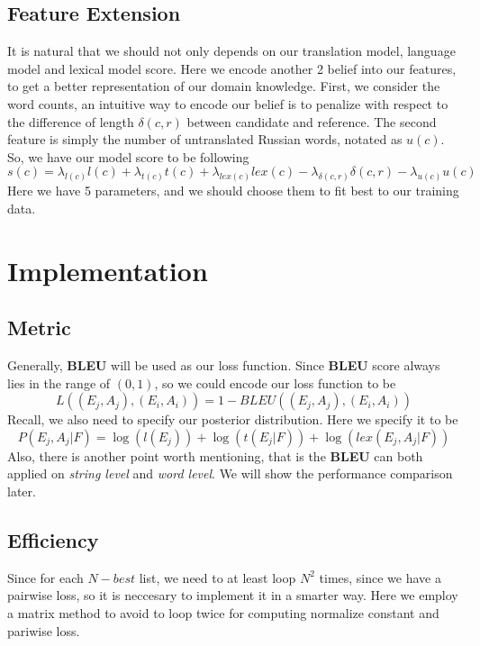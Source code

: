 \documentclass[11pt]{article}
\begin{document}
\subsection{Feature Extension} %
\label{sub:feature_extension}
It is natural that we should not only depends on our translation model, language model and lexical model score. Here we encode another 2 belief into our features, to get a better representation of our domain knowledge. First, we consider the word counts, an intuitive way to encode our belief is to penalize with respect to the difference of length $\delta(c, r)$ between candidate and reference. The second feature is simply the number of untranslated Russian words, notated as $u(c)$. So, we have our model score to be following
$$ s(c) = \lambda_{l(c)}l(c) + \lambda_{t(c)}t(c) + \lambda_{lex(c)}lex(c) - \lambda_{\delta(c, r)}\delta(c, r) - \lambda_{u(c)}u(c)$$
Here we have 5 parameters, and we should choose them to fit best to our training data.

\section{Implementation} %
\label{sec:implementation}
\subsection{Metric} %
\label{sub:metric}
Generally, \textbf{BLEU} will be used as our loss function. Since \textbf{BLEU} score always lies in the range of $(0,1)$, so we could encode our loss function to be
$$ L((E_j,A_j), (E_i,A_i)) = 1 - BLEU((E_j,A_j), (E_i,A_i))$$
Recall, we also need to specify our posterior distribution. Here we specify it to be
$$ P(E_j,A_j|F) = \log(l(E_j)) +  \log(t(E_j|F)) + \log(lex(E_j,A_j|F))$$
Also, there is another point worth mentioning, that is the \textbf{BLEU} can both applied on \textit{string level} and \textit{word level}. We will show the performance comparison later.
\subsection{Efficiency} %
\label{sub:efficiency}
Since for each $N-best$ list, we need to at least loop $N^2$ times, since we have a pairwise loss, so it is neccesary to implement it in a smarter way. Here we employ a matrix method to avoid to loop twice for computing normalize constant and pariwise loss.
\end{document}
